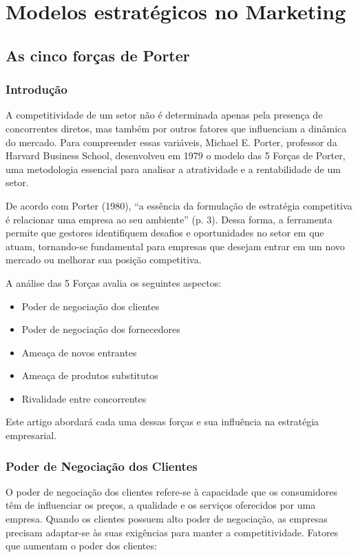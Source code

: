 \documentclass[11pt]{article}
\author{gustavodetarso}
\date{\today}
\title{}
\begin{document}
\tableofcontents

\section{Modelos estratégicos no Marketing}
\label{sec:org41204b2}
\subsection{As cinco forças de Porter}
\label{sec:org4f19a11}
\subsubsection{Introdução}
\label{sec:orgcd7717f}

A competitividade de um setor não é determinada apenas pela presença de concorrentes diretos, mas também por outros fatores que influenciam a dinâmica do mercado. Para compreender essas variáveis, Michael E. Porter, professor da Harvard Business School, desenvolveu em 1979 o modelo das 5 Forças de Porter, uma metodologia essencial para analisar a atratividade e a rentabilidade de um setor.

De acordo com Porter (1980), “a essência da formulação de estratégia competitiva é relacionar uma empresa ao seu ambiente” (p. 3). Dessa forma, a ferramenta permite que gestores identifiquem desafios e oportunidades no setor em que atuam, tornando-se fundamental para empresas que desejam entrar em um novo mercado ou melhorar sua posição competitiva.

A análise das 5 Forças avalia os seguintes aspectos:

\begin{itemize}
\item Poder de negociação dos clientes
\item Poder de negociação dos fornecedores
\item Ameaça de novos entrantes
\item Ameaça de produtos substitutos
\item Rivalidade entre concorrentes
\end{itemize}

Este artigo abordará cada uma dessas forças e sua influência na estratégia empresarial.
\subsubsection{Poder de Negociação dos Clientes}
\label{sec:org653a416}

O poder de negociação dos clientes refere-se à capacidade que os consumidores têm de influenciar os preços, a qualidade e os serviços oferecidos por uma empresa. Quando os clientes possuem alto poder de negociação, as empresas precisam adaptar-se às suas exigências para manter a competitividade.
Fatores que aumentam o poder dos clientes:
\end{document}
